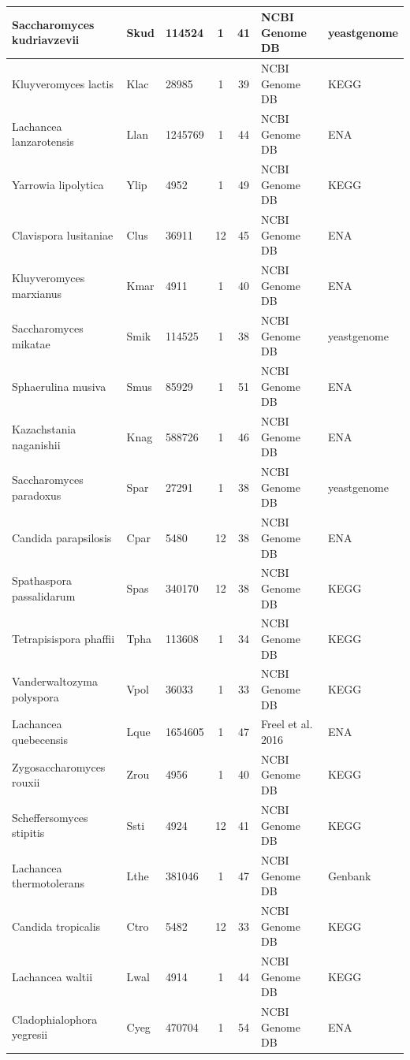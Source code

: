 \documentclass[12pt]{article}
\begin{document}
\begin{table}
\begin{tabular}{ | l | l | l | c | c | l | l | }
	Saccharomyces kudriavzevii 	& Skud 		& 114524 		&	1	& 41 	& NCBI Genome DB 	& yeastgenome \\ \hline
	Kluyveromyces lactis 		& Klac 		& 28985 		&	1	& 39 	& NCBI Genome DB 	& KEGG \\ \hline
	Lachancea lanzarotensis 	& Llan 		& 1245769 		&	1	& 44 	& NCBI Genome DB 	& ENA \\ \hline
	Yarrowia lipolytica 		& Ylip 		& 4952 			&	1	& 49 	& NCBI Genome DB 	& KEGG \\ \hline
	Clavispora lusitaniae 		& Clus 		& 36911 		&	12	& 45 	& NCBI Genome DB 	& ENA \\ \hline
	Kluyveromyces marxianus 	& Kmar 		& 4911 			&	1	& 40 	& NCBI Genome DB 	& ENA \\ \hline
	Saccharomyces mikatae 		& Smik 		& 114525 		&	1	& 38 	& NCBI Genome DB 	& yeastgenome \\ \hline
	Sphaerulina musiva 		& Smus 		& 85929 		&	1	& 51 	& NCBI Genome DB 	& ENA \\ \hline
	Kazachstania naganishii 	& Knag 		& 588726 		&	1	& 46 	& NCBI Genome DB 	& ENA \\ \hline
	Saccharomyces paradoxus 	& Spar 		& 27291 		&	1	& 38 	& NCBI Genome DB 	& yeastgenome \\ \hline
	Candida parapsilosis 		& Cpar 		& 5480 			&	12	& 38 	& NCBI Genome DB 	& ENA \\ \hline
	Spathaspora passalidarum 	& Spas 		& 340170 		&	12	& 38 	& NCBI Genome DB 	& KEGG \\ \hline
	Tetrapisispora phaffii 		& Tpha 		& 113608 		&	1	& 34 	& NCBI Genome DB 	& KEGG \\ \hline
	Vanderwaltozyma polyspora 	& Vpol 		& 36033 		&	1	& 33 	& NCBI Genome DB 	& KEGG \\ \hline
	Lachancea quebecensis 		& Lque 		& 1654605 		&	1	& 47 	& Freel et al. 2016 	& ENA \\ \hline
	Zygosaccharomyces rouxii 	& Zrou 		& 4956 			&	1	& 40 	& NCBI Genome DB 	& KEGG \\ \hline
	Scheffersomyces stipitis 	& Ssti 		& 4924 			&	12	& 41 	& NCBI Genome DB 	& KEGG \\ \hline
	Lachancea thermotolerans 	& Lthe 		& 381046 		&	1	& 47 	& NCBI Genome DB 	& Genbank \\ \hline
	Candida tropicalis 		& Ctro 		& 5482 			&	12	& 33 	& NCBI Genome DB 	& KEGG \\ \hline
	Lachancea waltii 		& Lwal 		& 4914 			&	1	& 44 	& NCBI Genome DB 	& KEGG  \\ \hline
	Cladophialophora yegresii 	& Cyeg 		& 470704 		&	1	& 54 	& NCBI Genome DB 	& ENA \\ \hline
\end{tabular}
\caption{}
\label{tab:org_overview}
\end{table}
\end{document}
